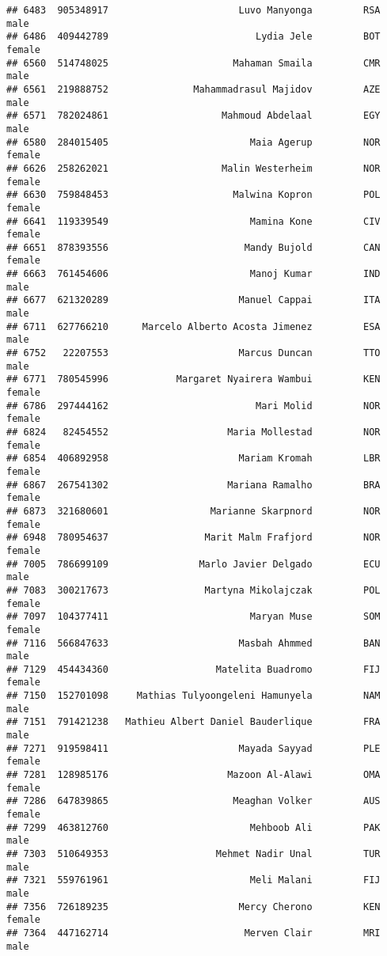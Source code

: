 \documentclass[]{article}
\begin{document}
\begin{verbatim}
## 6483  905348917                       Luvo Manyonga         RSA   male
## 6486  409442789                          Lydia Jele         BOT female
## 6560  514748025                      Mahaman Smaila         CMR   male
## 6561  219888752               Mahammadrasul Majidov         AZE   male
## 6571  782024861                    Mahmoud Abdelaal         EGY   male
## 6580  284015405                         Maia Agerup         NOR female
## 6626  258262021                    Malin Westerheim         NOR female
## 6630  759848453                      Malwina Kopron         POL female
## 6641  119339549                         Mamina Kone         CIV female
## 6651  878393556                        Mandy Bujold         CAN female
## 6663  761454606                         Manoj Kumar         IND   male
## 6677  621320289                       Manuel Cappai         ITA   male
## 6711  627766210      Marcelo Alberto Acosta Jimenez         ESA   male
## 6752   22207553                       Marcus Duncan         TTO   male
## 6771  780545996            Margaret Nyairera Wambui         KEN female
## 6786  297444162                          Mari Molid         NOR female
## 6824   82454552                     Maria Mollestad         NOR female
## 6854  406892958                       Mariam Kromah         LBR female
## 6867  267541302                     Mariana Ramalho         BRA female
## 6873  321680601                  Marianne Skarpnord         NOR female
## 6948  780954637                 Marit Malm Frafjord         NOR female
## 7005  786699109                Marlo Javier Delgado         ECU   male
## 7083  300217673                 Martyna Mikolajczak         POL female
## 7097  104377411                         Maryan Muse         SOM female
## 7116  566847633                       Masbah Ahmmed         BAN   male
## 7129  454434360                   Matelita Buadromo         FIJ female
## 7150  152701098     Mathias Tulyoongeleni Hamunyela         NAM   male
## 7151  791421238   Mathieu Albert Daniel Bauderlique         FRA   male
## 7271  919598411                       Mayada Sayyad         PLE female
## 7281  128985176                     Mazoon Al-Alawi         OMA female
## 7286  647839865                      Meaghan Volker         AUS female
## 7299  463812760                         Mehboob Ali         PAK   male
## 7303  510649353                   Mehmet Nadir Unal         TUR   male
## 7321  559761961                         Meli Malani         FIJ   male
## 7356  726189235                       Mercy Cherono         KEN female
## 7364  447162714                        Merven Clair         MRI   male

\end{verbatim}
\end{document}
